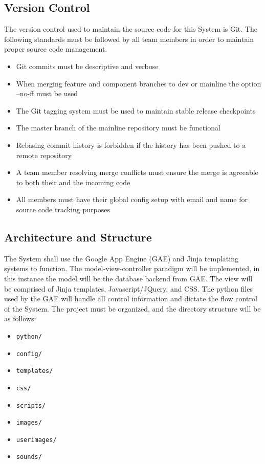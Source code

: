 \documentclass[12pt]{IEEEtran}
\begin{document}
\subsection{Version Control}
\label{subsec:git}

	The version control used to maintain the source code for this System is Git. The following standards must be followed by all team members in order to maintain proper source code management.
	\begin{itemize}
		\item Git commits must be descriptive and verbose
		\item When merging feature and component branches to dev or mainline the option --no-ff must be used
		\item The Git tagging system must be used to maintain stable release checkpoints
		\item The master branch of the mainline repository must be functional
		\item Rebasing commit history is forbidden if the history has been pushed to a remote repository
		\item A team member resolving merge conflicts must ensure the merge is agreeable to both their and the incoming code
		\item All members must have their global config setup with email and name for source code tracking purposes
	\end{itemize}
	

\subsection{Architecture and Structure}
\label{subsec:arch}

	The System shall use the Google App Engine (GAE) and Jinja templating systems to function. The model-view-controller 			paradigm will be implemented, in this instance the model will be the database backend from GAE. The view will be 				comprised of Jinja templates, Javascript/JQuery, and CSS. The python files used by the GAE will handle all control 			information and dictate the flow control of the System. The project must be organized, and the directory structure will 			be as follows:
	
	\newpage

	\begin{itemize}
		\item \texttt{python/}
		\item \texttt{config/}
		\item \texttt{templates/}
		\item \texttt{css/}
		\item \texttt{scripts/}
		\item \texttt{images/}
		\item \texttt{userimages/}
		\item \texttt{sounds/}
	\end{itemize}
\end{document}
